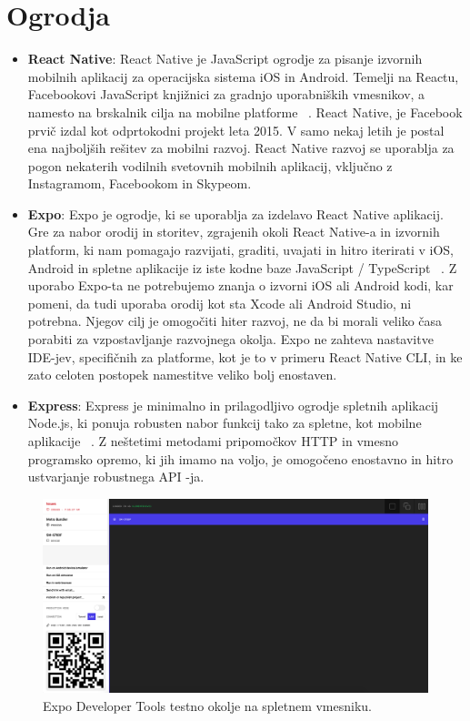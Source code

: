 \documentclass[a4paper, 12pt]{book}
\begin{document}
\section{Ogrodja}
 \begin{itemize}
  \item \textbf{React Native}: React Native je JavaScript ogrodje za pisanje izvornih mobilnih aplikacij za operacijska sistema iOS in Android. Temelji na Reactu, Facebookovi JavaScript knjižnici za gradnjo uporabniških vmesnikov, a namesto na brskalnik cilja na mobilne platforme ~\cite{RN}. 
React Native, je Facebook prvič izdal kot odprtokodni projekt leta 2015. V samo nekaj letih je postal ena najboljših rešitev za mobilni razvoj. React Native razvoj se uporablja za pogon nekaterih vodilnih svetovnih mobilnih aplikacij, vključno z Instagramom, Facebookom in Skypeom.
  
  \item \textbf{Expo}: Expo je ogrodje, ki se uporablja za izdelavo React Native aplikacij. Gre za nabor orodij in storitev, zgrajenih okoli React Native-a in izvornih platform, ki nam pomagajo razvijati, graditi, uvajati in hitro iterirati v iOS, Android in spletne aplikacije iz iste kodne baze JavaScript / TypeScript ~\cite{EXPO}. Z uporabo Expo-ta ne potrebujemo znanja o izvorni iOS ali Android kodi, kar pomeni, da tudi uporaba orodij kot sta Xcode ali Android Studio, ni potrebna. Njegov cilj je omogočiti hiter razvoj, ne da bi morali veliko časa porabiti za vzpostavljanje razvojnega okolja. Expo ne zahteva nastavitve IDE-jev, specifičnih za platforme, kot je to v primeru React Native CLI, in ke zato celoten postopek namestitve veliko bolj enostaven.
  
  
\item \textbf{Express}: Express je minimalno in prilagodljivo ogrodje spletnih aplikacij Node.js, ki ponuja robusten nabor funkcij tako za spletne, kot mobilne aplikacije  ~\cite{Express}. Z neštetimi metodami pripomočkov HTTP in vmesno programsko opremo, ki jih imamo na voljo, je omogočeno enostavno in hitro ustvarjanje robustnega API -ja.
\end{itemize}

\begin{figure}[ht]
\centering
  \begin{minipage}[b]{0.5\textwidth}
    \includegraphics[width=\textwidth]{expodeveloper.png}\centering
  \end{minipage}
    \caption{Expo Developer Tools testno okolje na spletnem vmesniku.}
    \label{expo}
\end{figure}
\end{document}

